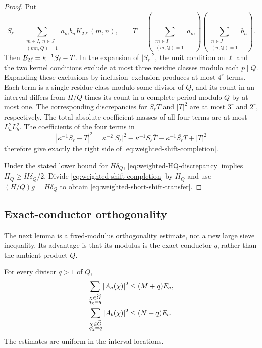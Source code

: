 \begin{proof}
Put
\[
 S_\ell
 =\sum_{\substack{m\in I,\ n\in J\\(mn,Q)=1}}
 a_mb_nK_{2\ell}(m,n),
 \qquad
 T=\left(\sum_{\substack{m\in I\\(m,Q)=1}}a_m\right)
   \left(\sum_{\substack{n\in J\\(n,Q)=1}}b_n\right).
\]
Then $\mathcal B_{2\ell}=\kappa^{-1}S_\ell-T$.  In the expansion of
$|S_\ell|^2$, the unit condition on $\ell$ and the two kernel conditions
exclude at most three residue classes modulo each $p\mid Q$.  Expanding
these exclusions by inclusion--exclusion produces at most $4^r$ terms.
Each term is a single residue class modulo some divisor of $Q$, and its
count in an interval differs from $H/Q$ times its count in a complete
period modulo $Q$ by at most one.
The corresponding discrepancies for $S_\ell\overline T$ and $|T|^2$ are
at most $3^r$ and $2^r$, respectively.  The total absolute coefficient
masses of all four terms are at most $L_a^2L_b^2$.  The coefficients of
the four terms in
\[
 |\kappa^{-1}S_\ell-T|^2
 =\kappa^{-2}|S_\ell|^2
  -\kappa^{-1}S_\ell\overline T
  -\kappa^{-1}\overline{S_\ell}T+|T|^2
\]
therefore give exactly the right side of
\eqref{eq:weighted-shift-completion}.

Under the stated lower bound for $H\delta_Q$,
\eqref{eq:weighted-HQ-discrepancy} implies
$H_Q\geq H\delta_Q/2$.  Divide
\eqref{eq:weighted-shift-completion} by $H_Q$ and use
$(H/Q)g=H\delta_Q$ to obtain
\eqref{eq:weighted-short-shift-transfer}.
\end{proof}

\subsection{Exact-conductor orthogonality}

The next lemma is a fixed-modulus orthogonality estimate, not a new large
sieve inequality.  Its advantage is that its modulus is the exact conductor
$q$, rather than the ambient product $Q$.

\begin{lemma}
\label{lem:weighted-exact-conductor-orthogonality}
For every divisor $q>1$ of $Q$,
\begin{align}
 \sum_{\substack{\chi\in\widehat G\\q_\chi=q}}|A_a(\chi)|^2
 &\leq(M+q)E_a,
 \label{eq:weighted-exact-q-second-moment-a}\\
 \sum_{\substack{\chi\in\widehat G\\q_\chi=q}}|A_b(\chi)|^2
 &\leq(N+q)E_b.
 \label{eq:weighted-exact-q-second-moment-b}
\end{align}
The estimates are uniform in the interval locations.
\end{lemma}

